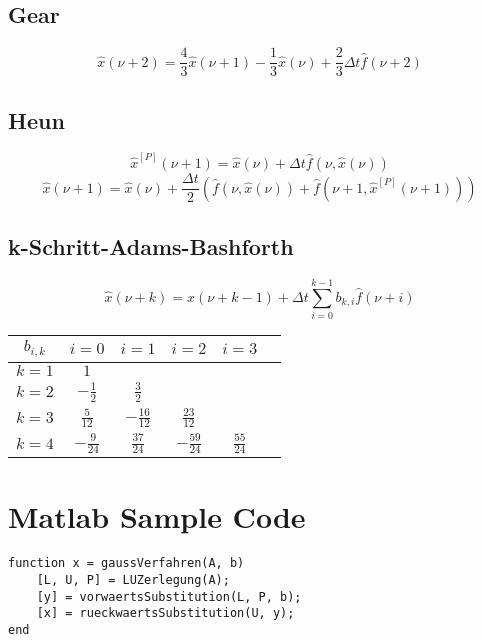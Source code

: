 \documentclass[german]{latex4ei/latex4ei_sheet}
\begin{document}
\begin{sectionbox}
\subsection{Gear}
\begin{equation*}
	\hat{x}(\nu + 2) = \frac{4}{3} \hat{x}(\nu + 1) - \frac{1}{3} \hat{x}(\nu) + \frac{2}{3} \Delta t \hat{f}(\nu + 2)
\end{equation*}

\subsection{Heun}
\begin{equation*}
	\hat{x}^{[P]}(\nu + 1) = \hat{x}(\nu) + \Delta t \hat{f}(\nu, \hat{x}(\nu))
\end{equation*}
\begin{equation*}
	\hat{x}(\nu + 1) = \hat{x}(\nu) + \frac{\Delta t}{2} \left( \hat{f}(\nu, \hat{x}(\nu)) + \hat{f}(\nu + 1, \hat{x}^{[P]}(\nu + 1)) \right)
\end{equation*}

\subsection{k-Schritt-Adams-Bashforth}
\begin{equation*}
	\hat x(\nu + k) = \hat x(\nu + k - 1) + \Delta t\sum_{i=0}^{k-1}b_{k,i}\hat f(\nu + i)
\end{equation*}
\begin{tabularx}{\columnwidth}{C|CCCCC}
$b_{i,k}$ & $i=0$ & $i=1$ & $i=2$ & $i=3$ \\ \hline
$k=1$ & $1$ & & & \\
$k=2$ & $-\frac{1}{2}$ & $\frac{3}{2}$ & & \\
$k=3$ & $\frac{5}{12}$ & $-\frac{16}{12}$ & $\frac{23}{12}$ & \\
$k=4$ & $-\frac{9}{24}$ & $\frac{37}{24}$ & $-\frac{59}{24}$ & $\frac{55}{24}$
\end{tabularx}
\end{sectionbox}

\section{Matlab Sample Code}
\begin{lstlisting}
function x = gaussVerfahren(A, b)
    [L, U, P] = LUZerlegung(A);
    [y] = vorwaertsSubstitution(L, P, b);
    [x] = rueckwaertsSubstitution(U, y);
end
\end{lstlisting}
\end{document}
